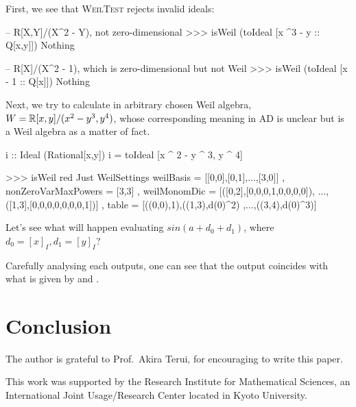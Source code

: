 \documentclass[%
  sigconf,authorversion,screen]{acmart}
\begin{document}
First, we see that \textsc{WeilTest} rejects invalid ideals:

\begin{code}
-- R[X,Y]/(X^2 - Y), not zero-dimensional
>>> isWeil (toIdeal [x ^3 - y :: Q[x,y]])
Nothing

-- R[X]/(X^2 - 1), which is zero-dimensional but not Weil
>>> isWeil (toIdeal [x - 1 :: Q[x]])
Nothing
\end{code}

Next, we try to calculate in arbitrary chosen Weil algebra, $W = \mathbb{R}[x,y]/(x^2 - y^3, y^4)$, whose corresponding meaning in AD is unclear but is a Weil algebra as a matter of fact.

\begin{code}
i :: Ideal (Rational[x,y])
i = toIdeal [x ^ 2 - y ^ 3, y ^ 4]

>>> isWeil red
Just WeilSettings 
  {weilBasis =
    [[0,0],[0,1],...,[3,0]]
  , nonZeroVarMaxPowers = [3,3]
  , weilMonomDic = 
    [([0,2],[0,0,0,1,0,0,0,0]),
      ...,([1,3],[0,0,0,0,0,0,0,1])]
  , table = [((0,0),1),((1,3),d(0)^2)
      ,...,((3,4),d(0)^3)]
  }
\end{code}

Let's see what will happen evaluating $sin(a + d_0 + d_1)$, where $d_0 = [x]_I, d_1 = [y]_I$?


Carefully analysing each outputs, one can see that the output coincides with what is given by  and .

\section{Conclusion}\label{sec:concl}

\begin{acks}
The author is grateful to Prof.\ Akira Terui, for encouraging  to write this paper.

This work was supported by the Research Institute for Mathematical Sciences,
an International Joint Usage/Research Center located in Kyoto University.
\end{acks}



\end{document}
